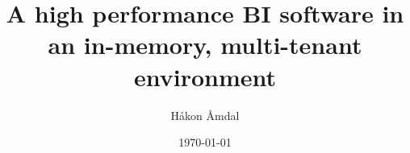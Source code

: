 \title{A high performance BI software in an in-memory, multi-tenant environment}
\author{Håkon Åmdal}
\date{\today}
